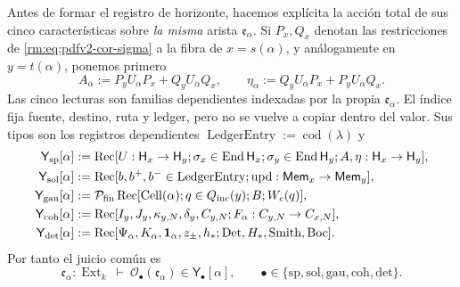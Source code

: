 Antes de formar el registro de horizonte, hacemos explícita la acción total
de sus cinco características sobre \emph{la misma} arista
\(\mathfrak e_\alpha\). Si \(P_x,Q_x\) denotan las restricciones de
\eqref{rm:eq:pdfv2-cor-sigma} a la fibra de \(x=s(\alpha)\), y análogamente en
\(y=t(\alpha)\), ponemos primero
\begin{equation}
\label{rm:eq:pdfv2-cor-a-eta-emision}
 A_\alpha:=P_yU_\alpha P_x+Q_yU_\alpha Q_x,
 \qquad
 \eta_\alpha:=Q_yU_\alpha P_x+P_yU_\alpha Q_x.
\end{equation}
Las cinco lecturas son familias dependientes indexadas por la propia
\(\mathfrak e_\alpha\). El índice fija fuente, destino, ruta y ledger, pero
no se vuelve a copiar dentro del valor. Sus tipos son los registros
dependientes
\(\operatorname{LedgerEntry}:=\operatorname{cod}(\lambda)\) y
\begin{align*}
 \mathsf Y_{\rm sp}[\alpha]&:=
 \operatorname{Rec}[U:\mathsf H_x\to\mathsf H_y;
 \sigma_x\in\operatorname{End}\mathsf H_x;
 \sigma_y\in\operatorname{End}\mathsf H_y;A,\eta:\mathsf H_x\to\mathsf H_y],\\
 \mathsf Y_{\rm sol}[\alpha]&:=
 \operatorname{Rec}[b,b^+,b^-\in\operatorname{LedgerEntry};
 \operatorname{upd}:\mathsf{Mem}_x\to\mathsf{Mem}_y],\\
 \mathsf Y_{\rm gau}[\alpha]&:=
 \mathcal P_{\rm fin}\operatorname{Rec}[
 \operatorname{Cell}(\alpha);q\in Q_{\rm inc}(y);B;W_c(q)],\\
 \mathsf Y_{\rm coh}[\alpha]&:=
 \operatorname{Rec}[I_y,J_y,\kappa_{y,N},\delta_y,C_{y,N};
 F_\alpha:C_{y,N}\to C_{x,N}],\\
 \mathsf Y_{\rm det}[\alpha]&:=
 \operatorname{Rec}[\Psi_\alpha,K_\alpha,\mathbf1_\alpha,z_\pm,h_*;
 \operatorname{Det},H_*,\operatorname{Smith},\operatorname{Boc}].
\end{align*}
Por tanto el juicio común es
\[
 \mathfrak e_\alpha:\operatorname{Ext}_k\ \vdash\
 \mathcal O_\bullet(\mathfrak e_\alpha)
 \in\mathsf Y_\bullet[\alpha],
 \qquad
 \bullet\in\{\mathrm{sp,sol,gau,coh,det}\}.
\]
